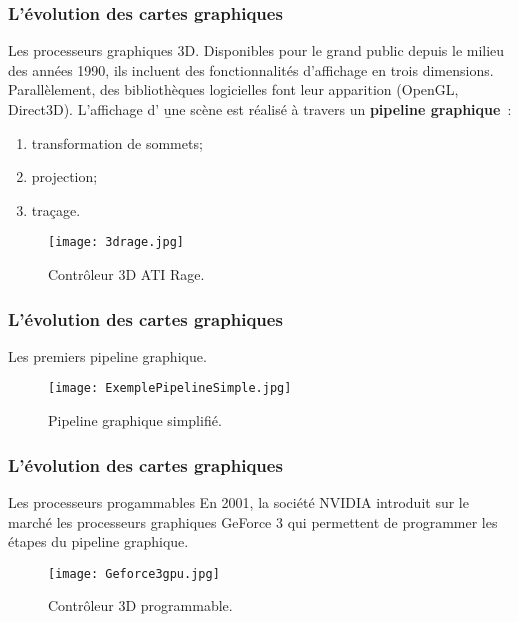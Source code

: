 \begin{frame}
  \frametitle{L'évolution des cartes graphiques}
\begin{block}{Les processeurs graphiques 3D.}
    Disponibles pour le grand public depuis le milieu des années 1990, ils incluent des fonctionnalités
    d'affichage en trois dimensions. Parallèlement, des bibliothèques logicielles font leur apparition
    (OpenGL, Direct3D). L'affichage d' {\b une scène} est réalisé à travers un {\bf pipeline graphique}~: 
        
        \begin{enumerate}
            \item transformation de sommets;
            \item projection;
            \item traçage.
        \end{enumerate}
    
    \begin{figure}[htbp]
        \centering
       \texttt{[image: 3drage.jpg]} 
        \caption{Contrôleur 3D ATI Rage.}
        \label{fig:ati_rage}
    \end{figure}
\end{block}
\end{frame}

\begin{frame}
  \frametitle{L'évolution des cartes graphiques}
\begin{block}{Les premiers pipeline graphique.}
    \begin{figure}[htbp]
        \centering
       \texttt{[image: ExemplePipelineSimple.jpg]} 
        \caption{Pipeline graphique simplifié.}
        \label{fig:pipeline}
    \end{figure}
\end{block}
\end{frame}


\begin{frame}
  \frametitle{L'évolution des cartes graphiques}
\begin{block}{Les processeurs progammables}
    En 2001, la société NVIDIA introduit sur le marché les processeurs graphiques
    GeForce 3 qui permettent de programmer les étapes du pipeline graphique. 
    \begin{figure}[htbp]
        \centering
       \texttt{[image: Geforce3gpu.jpg]} 
        \caption{Contrôleur 3D programmable.}
        \label{fig:geforce3}
    \end{figure}
\end{block}
\end{frame}

